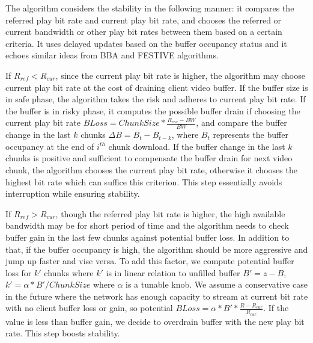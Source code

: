 The algorithm considers the stability in the following manner: it compares the referred play bit rate and current play bit rate, and chooses the referred or current bandwidth or other play bit rates between them based on a certain criteria. It uses delayed updates based on the buffer occupancy status and it echoes similar ideas from BBA and FESTIVE algorithms\cite{BBA, Festive}. 

If $R_{ref} < R_{cur}$, since the current play bit rate is higher, the algorithm may choose current play bit rate at the cost of draining client video buffer. If the buffer size is in safe phase, the algorithm takes the risk and adheres to current play bit rate. If the buffer is in risky phase, it computes the possible buffer drain if choosing the current play bit rate $BLoss =ChunkSize*\frac{R_{cur}-BW}{BW}$, and compare the buffer change in the last $k$ chunks $\Delta B = B_{t} -B_{t-k}$, where $B_{t}$ represents the buffer occupancy at the end of $i^{th}$ chunk download. If the buffer change in the last $k$ chunks is positive and sufficient to compensate the buffer drain for next video chunk, the algorithm chooses the current play bit rate, otherwise it chooses the highest bit rate which can suffice this criterion. This step essentially avoids interruption while ensuring stability.

If $R_{ref} >R_{cur} $, though the referred play bit rate is higher, the high available bandwidth may be for short period of time and the algorithm needs to check buffer gain in the last few chunks against potential buffer loss. In addition to that, if the buffer occupancy is high, the algorithm should be more aggressive and jump up faster and vise versa. To add this factor, we compute potential buffer loss for $k'$ chunks where $k'$ is in linear relation to unfilled buffer $B'=z-B$, $k'=\alpha * B'/ChunkSize$ where $\alpha$ is a tunable knob. We assume a conservative case in the future where the network has enough capacity to stream at current bit rate with no client buffer loss or gain, so potential $BLoss=\alpha * B' *\frac{R-R_{cur}}{R_{cur}} $. If the value is less than buffer gain, we decide to overdrain buffer with the new play bit rate. This step boosts stability.





